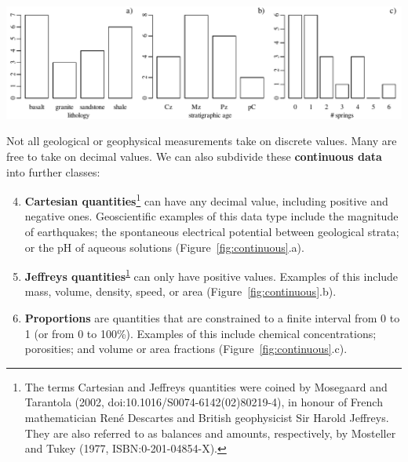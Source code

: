\noindent\includegraphics[width=\textwidth]{../figures/discrete.pdf}\medskip
\begingroup {}
\label{fig:discrete}
\endgroup

Not all geological or geophysical measurements take on discrete
values.  Many are free to take on decimal values. We can also
subdivide these \textbf{continuous data} into further classes:

\begin{enumerate}
  \setcounter{enumi}{3}
\item\textbf{Cartesian quantities}\footnote{The terms Cartesian and
Jeffreys quantities were coined by Mosegaard and Tarantola (2002,
doi:10.1016/S0074-6142(02)80219-4), in honour of French mathematician
Ren\'{e} Descartes and British geophysicist Sir Harold Jeffreys. They
are also referred to as balances and amounts, respectively, by
Mosteller and Tukey (1977, ISBN:0-201-04854-X).\label{ftn:Tarantola}}
  can have any decimal value, including positive and negative
  ones. Geoscientific examples of this data type include the magnitude
  of earthquakes; the spontaneous electrical potential between
  geological strata; or the pH of aqueous solutions
  (Figure~\ref{fig:continuous}.a).
  
\item\textbf{Jeffreys quantities}\textsuperscript{\ref{ftn:Tarantola}}
  can only have positive values. Examples of this include mass,
  volume, density, speed, or area (Figure~\ref{fig:continuous}.b).
  
\item\textbf{Proportions} are quantities that are constrained to a
  finite interval from 0 to 1 (or from 0 to 100\%). Examples of this
  include chemical concentrations; porosities; and volume or area
  fractions (Figure~\ref{fig:continuous}.c).
\end{enumerate}

